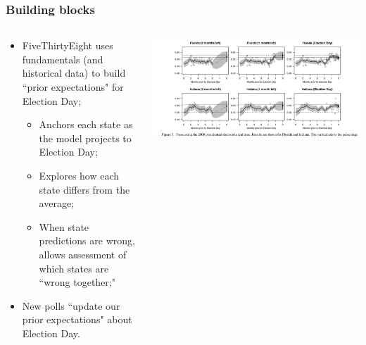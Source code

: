 \documentclass[aspectratio=169]{beamer}
\theoremstyle{principle}
\begin{document}
%
%
%
%

\begin{frame}
\frametitle{Building blocks}

\begin{columns}
\begin{column}{0.5\textwidth}

\begin{itemize}
\item FiveThirtyEight uses fundamentals (and historical data) to build ``prior expectations" for Election Day;
\begin{itemize}
\item Anchors each state as the model projects to Election Day;
\item Explores how each state differs from the average;
\item When state predictions are wrong, allows assessment of which states are ``wrong together;"
\end{itemize}
\bigskip

\item New polls ``update our prior expectations" about Election Day.
\end{itemize}

\end{column}
\begin{column}{0.5\textwidth}
\includegraphics[scale=0.15]{random-walk.png}
\end{column}
\end{columns}

\end{frame}
\end{document}
